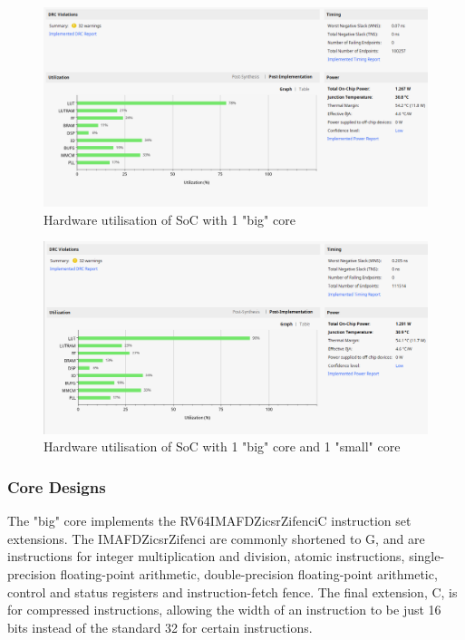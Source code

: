 \begin{figure}[h!]
    \centering
    \includegraphics[scale=0.5]{./img/SoC_b1.png}
    \caption{Hardware utilisation of SoC with 1 "big" core}
    \label{fig:b1-util}
\end{figure}

\begin{figure}[h!]
    \centering
    \includegraphics[scale=0.5]{./img/SoC_b1s1.png}
    \caption{Hardware utilisation of SoC with 1 "big" core and 1 "small" core}
    \label{fig:b1s1-util}
\end{figure}

\subsubsection{Core Designs}
The "big" core implements the RV64IMAFDZicsrZifenciC\cite{riscv-1} instruction set extensions. The IMAFDZicsrZifenci are commonly shortened to G, and are instructions for integer multiplication and division, atomic instructions, single-precision floating-point arithmetic, double-precision floating-point arithmetic, control and status registers and instruction-fetch fence. The final extension, C, is for compressed instructions, allowing the width of an instruction to be just 16 bits instead of the standard 32 for certain instructions. 

